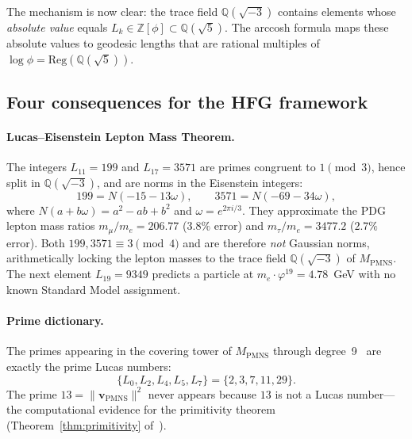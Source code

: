 ﻿\documentclass[12pt]{article}
\theoremstyle{definition}
\begin{document}
\medskip
The mechanism is now clear: the trace field $\mathbb{Q}(\sqrt{-3})$
contains elements whose \emph{absolute value} equals $L_k \in
\mathbb{Z}[\phi] \subset \mathbb{Q}(\sqrt{5})$. The arccosh formula
maps these absolute values to geodesic lengths that are rational
multiples of $\log\phi = \mathrm{Reg}(\mathbb{Q}(\sqrt{5}))$.

\subsection*{Four consequences for the HFG framework}

\paragraph{Lucas--Eisenstein Lepton Mass Theorem.}
The integers $L_{11}=199$ and $L_{17}=3571$ are primes congruent
to $1\pmod{3}$, hence split in $\mathbb{Q}(\sqrt{-3})$, and are
norms in the Eisenstein integers:
\[
  199 = N(-15-13\omega),\qquad 3571 = N(-69-34\omega),
\]
where $N(a+b\omega)=a^2-ab+b^2$ and $\omega=e^{2\pi i/3}$.
They approximate the PDG lepton mass ratios $m_\mu/m_e=206.77$
($3.8\%$ error) and $m_\tau/m_e=3477.2$ ($2.7\%$ error).
Both $199,3571\equiv3\pmod{4}$ and are therefore \emph{not}
Gaussian norms, arithmetically locking the lepton masses to the
trace field $\mathbb{Q}(\sqrt{-3})$ of $M_{\mathrm{PMNS}}$.
The next element $L_{19}=9349$ predicts a particle at
$m_e\cdot\varphi^{19}=4.78$~GeV with no known Standard Model
assignment.

\paragraph{Prime dictionary.}
The primes appearing in the covering tower of $M_\mathrm{PMNS}$
through degree~9~\cite{Gentry:Covering} are exactly the prime Lucas
numbers:
\[
  \{L_0, L_2, L_4, L_5, L_7\} = \{2, 3, 7, 11, 29\}.
\]
The prime $13 = \|\mathbf{v}_\mathrm{PMNS}\|^2$ never appears because
$13$ is not a Lucas number---the computational evidence for the
primitivity theorem (Theorem~\ref{thm:primitivity} of~\cite{Gentry:Covering}).
\end{document}
